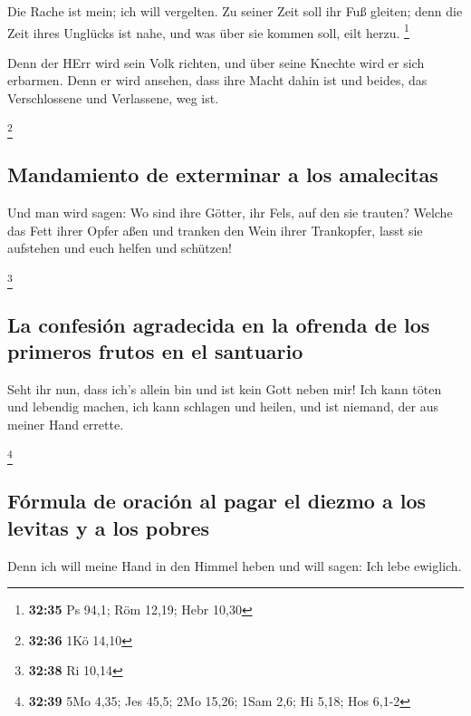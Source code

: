  Die Rache ist mein; ich will vergelten. Zu seiner Zeit
soll ihr Fuß gleiten; denn die Zeit ihres Unglücks ist nahe, und was
über sie kommen soll, eilt herzu. \footnote{\textbf{32:35} Ps 94,1; Röm
  12,19; Hebr 10,30}

 Denn der HErr wird sein Volk richten, und über seine
Knechte wird er sich erbarmen. Denn er wird ansehen, dass ihre Macht
dahin ist und beides, das Verschlossene und Verlassene, weg ist.

\footnote{\textbf{32:36} 1Kö 14,10}

\hypertarget{mandamiento-de-exterminar-a-los-amalecitas}{%
\subsection{Mandamiento de exterminar a los
amalecitas}\label{mandamiento-de-exterminar-a-los-amalecitas}}

 Und man wird sagen: Wo sind ihre Götter, ihr Fels, auf
den sie trauten?  Welche das Fett ihrer Opfer aßen und
tranken den Wein ihrer Trankopfer, lasst sie aufstehen und euch helfen
und schützen!

\footnote{\textbf{32:38} Ri 10,14}

\hypertarget{la-confesiuxf3n-agradecida-en-la-ofrenda-de-los-primeros-frutos-en-el-santuario}{%
\subsection{La confesión agradecida en la ofrenda de los primeros frutos
en el
santuario}\label{la-confesiuxf3n-agradecida-en-la-ofrenda-de-los-primeros-frutos-en-el-santuario}}

 Seht ihr nun, dass ich's allein bin und ist kein Gott
neben mir! Ich kann töten und lebendig machen, ich kann schlagen und
heilen, und ist niemand, der aus meiner Hand errette.

\footnote{\textbf{32:39} 5Mo 4,35; Jes 45,5; 2Mo 15,26; 1Sam 2,6; Hi
  5,18; Hos 6,1-2}

\hypertarget{fuxf3rmula-de-oraciuxf3n-al-pagar-el-diezmo-a-los-levitas-y-a-los-pobres}{%
\subsection{Fórmula de oración al pagar el diezmo a los levitas y a los
pobres}\label{fuxf3rmula-de-oraciuxf3n-al-pagar-el-diezmo-a-los-levitas-y-a-los-pobres}}

 Denn ich will meine Hand in den Himmel heben und will
sagen: Ich lebe ewiglich.


